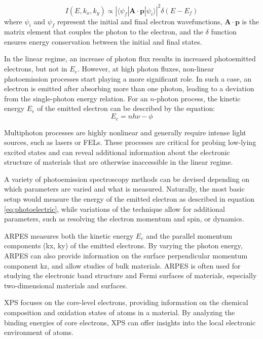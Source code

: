 \begin{equation}
    I(E, k_x, k_y) \propto |\langle \psi_f | \mathbf{A} \cdot \mathbf{p} | \psi_i \rangle|^2 \delta(E - E_f)
\end{equation}
where $\psi_i$ and $\psi_f$ represent the initial and final electron wavefunctions, $\mathbf{A} \cdot \mathbf{p}$ is the matrix element that couples the photon to the electron, and the $\delta$ function ensures energy conservation between the initial and final states.

In the linear regime, an increase of photon flux results in increased photoemitted electrons, but not in $E_e$. However, at high photon fluxes, non-linear photoemission processes start playing a more significant role. In such a case, an electron is emitted after absorbing more than one photon, leading to a deviation from the single-photon energy relation. For an $n$-photon process, the kinetic energy $E_e$ of the emitted electron can be described by the equation:
\begin{equation}
    E_e = n h\nu - \phi
\end{equation}

Multiphoton processes are highly nonlinear and generally require intense light sources, such as lasers or \glspl{FEL}. These processes are critical for probing low-lying excited states and can reveal additional information about the electronic structure of materials that are otherwise inaccessible in the linear regime.

A variety of photoemission spectroscopy methods can be devised depending on which parameters are varied and what is measured. Naturally, the most basic setup would measure the energy of the emitted electron as described in equation \ref{eq:photoelectric}, while variations of the technique allow for additional parameters, such as resolving the electron momentum and spin, or dynamics.

\Gls{ARPES} measures both the kinetic energy $E_e$ and the parallel momentum components (\gls{kx}, \gls{ky}) of the emitted electrons. By varying the photon energy, \gls{ARPES} can also provide information on the surface perpendicular momentum component \gls{kz}, and allow studies of bulk materials. \Gls{ARPES} is often used for studying the electronic band structure and Fermi surfaces of materials, especially two-dimensional materials and surfaces.

\Gls{XPS} focuses on the core-level electrons, providing information on the chemical composition and oxidation states of atoms in a material. By analyzing the binding energies of core electrons, \gls{XPS} can offer insights into the local electronic environment of atoms.

